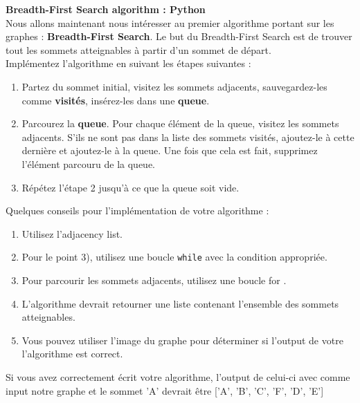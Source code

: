 \begin{Exercice}[20 minutes]  \textbf{Breadth-First Search algorithm : Python}\\
    Nous allons maintenant nous intéresser au premier algorithme portant sur les graphes : \textbf{Breadth-First Search}. Le but du Breadth-First Search est de trouver tout les sommets atteignables à partir d'un sommet de départ.\\
    Implémentez l'algorithme en suivant les étapes suivantes :\\
    \begin{enumerate}
    
    \item Partez du sommet initial, visitez les sommets adjacents, sauvegardez-les comme \textbf{visités}, insérez-les dans une \textbf{queue}.
    
    \item Parcourez la \textbf{queue}. Pour chaque élément de la queue, visitez les sommets adjacents. S'ils ne sont pas dans la liste des sommets visités, ajoutez-le à cette dernière et ajoutez-le à la queue. Une fois que cela est fait, supprimez l'élément parcouru de la queue.
    
    \item Répétez l'étape 2 jusqu'à ce que la queue soit vide.\\

    \end{enumerate}

    \begin{conseil}
        Quelques conseils pour l'implémentation de votre algorithme :
        \begin{enumerate}
            \item Utilisez l'adjacency list.
            \item Pour le point 3), utilisez une boucle \lstinline{while} avec la condition appropriée.
            \item Pour parcourir les sommets adjacents, utilisez une boucle for .
            \item L'algorithme devrait retourner une liste contenant l'ensemble des sommets atteignables.
            \item Vous pouvez utiliser l'image du graphe pour déterminer si l'output de votre l'algorithme est correct.
        \end{enumerate}
    \end{conseil}
    \begin{solution}
        
        Si vous avez correctement écrit votre algorithme, l'output de celui-ci avec comme input notre graphe et le sommet 'A' devrait être ['A', 'B', 'C', 'F', 'D', 'E']
    \end{solution}
\end{Exercice}


